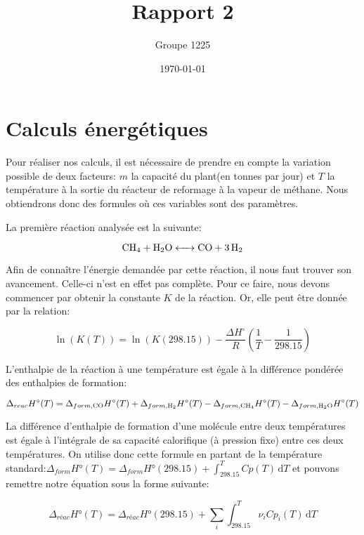 \documentclass[a4paper, oneside, 12pt]{article}
\title{Rapport 2}
\author{Groupe 1225}
\date{\today}
\begin{document}
\maketitle


\section{Calculs énergétiques}

Pour réaliser nos calculs, il est nécessaire de prendre 
en compte la variation possible de 
deux facteurs: $m$ la capacité du plant(en tonnes par jour) 
et $T$ la température à la sortie du
réacteur de reformage à la vapeur de méthane.
Nous obtiendrons donc des formules où ces variables sont des paramètres.

La première réaction analysée est la suivante:

\begin{equation*}
	\ce{CH4 + H2O <-> CO + 3H2}
\end{equation*}

Afin de connaître l'énergie demandée par cette réaction,
il nous faut trouver son avancement. Celle-ci n'est en effet pas complète.
Pour ce faire, nous devons commencer par obtenir la constante $K$ 
de la réaction. Or, elle peut être donnée par la relation:

\begin{equation}
	\ln{(K(T))} = \ln{(K(298.15))} - 
	\frac{\Delta H^{\circ}}{R}(\frac{1}{T} - \frac{1}{298.15})
\end{equation}

L'enthalpie de la réaction à une température est égale 
à la différence pondérée des enthalpies de formation:

\begin{equation}
	\Delta_{reac} H^{\circ} (T)= \Delta_{form,\ce{CO}} H^{\circ}(T)
	+\Delta_{form, \ce{H2}} H^{\circ} (T) - \Delta_{form, \ce{CH4}} H^{\circ} (T) 
	-\Delta_{form, \ce{H2O}} H^{\circ} (T)
\end{equation}

La différence d'enthalpie de formation d'une molécule entre deux températures est
égale à l'intégrale de sa capacité calorifique (à pression fixe) entre ces deux températures.
On utilise donc cette formule en partant de la température standard:$\Delta_{form}H°(T)= \Delta_{form}H°(298.15)+\int_298.15^T Cp(T) \, \mathrm dT$ et pouvons remettre notre équation sous la forme suivante:

\begin{equation}
	\Delta_{réac}H°(T)=\Delta_{réac}H°(298.15)+\sum_i \int_{298.15}^T \nu_i Cp_i(T) \, \mathrm dT
\end{equation}
\end{document}
